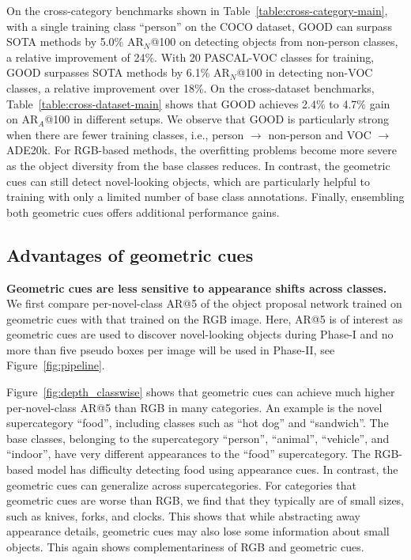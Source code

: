 \documentclass{article} \usepackage{iclr2023_conference,times}
\begin{document}
On the cross-category benchmarks shown in Table~\ref{table:cross-category-main}, with a single training class ``person'' on the COCO dataset, GOOD can surpass SOTA methods by 5.0\% AR$_N$@100 on detecting objects from non-person classes, a relative improvement of 24\%. With 20 PASCAL-VOC classes for training, GOOD surpasses SOTA methods by 6.1\% AR$_N$@100 in detecting non-VOC classes, a relative improvement over 18\%. On the cross-dataset benchmarks, Table~\ref{table:cross-dataset-main} shows that GOOD achieves 2.4\% to 4.7\% gain on AR$_A$@100 in different setups. We observe that GOOD is particularly strong when there are fewer training classes, i.e., person $\rightarrow$ non-person and VOC $\rightarrow$ ADE20k. For RGB-based methods, the overfitting problems become more severe as the object diversity from the base classes reduces. In contrast, the geometric cues can still detect novel-looking objects, which are particularly helpful to training with only a limited number of base class annotations. Finally, ensembling both geometric cues offers additional performance gains.



\subsection{Advantages of geometric cues}

\textbf{Geometric cues are less sensitive to appearance shifts across classes.}
We first compare per-novel-class AR@5 of the object proposal network trained on geometric cues with that trained on the RGB image. Here, AR@5 is of interest as geometric cues are used to discover novel-looking objects during Phase-I and no more than five pseudo boxes per image will be used in Phase-II, see Figure~\ref{fig:pipeline}.

Figure~\ref{fig:depth_classwise} shows that geometric cues can achieve much higher per-novel-class AR@5 than RGB in many categories. An example is the novel  supercategory ``food'', including classes such as ``hot dog'' and ``sandwich''. The base classes, belonging to the supercategory ``person'', ``animal'', ``vehicle'', and ``indoor'', have very different appearances to the ``food'' supercategory. The RGB-based model has difficulty detecting food using appearance cues.
In contrast, the  geometric cues can generalize across supercategories.
For categories that geometric cues are worse than RGB, we find that they typically are of small sizes, such as knives, forks, and clocks. This shows that while abstracting away appearance details, geometric cues may also lose some information about small objects. This again shows complementariness of RGB and geometric cues.
\end{document}
